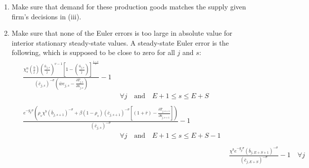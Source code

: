 \begin{enumerate}
    \item Make sure that demand for these production goods matches the supply given firm's decisions in (iii).
    \item Make sure that none of the Euler errors is too large in absolute value for interior stationary steady-state values. A steady-state Euler error is the following, which is supposed to be close to zero for all $j$ and $s$:
      \begin{align}
        \begin{split}
          &\frac{\chi^n_{s}\left(\frac{b}{\tilde{l}}\right)\left(\frac{\bar{n}_{j,s}}{\tilde{l}}\right)^{v-1}\left[1 - \left(\frac{\bar{n}_{j,s}}{\tilde{l}}\right)\right]^{\frac{1-v}{v}}}{(\bar{c}_{j,s})^{-\sigma}\left(\bar{w} e_{j,s} - \frac{\partial\bar{T}_{j,s}}{\partial \bar{n}_{j,s}}\right)} - 1 \\
          &\qquad\qquad\qquad\qquad\qquad\qquad\qquad\forall j\quad\text{and}\quad E+1\leq s\leq E+S
        \end{split} \label{EqSSeulerrLab} \\
        \begin{split}
          &\frac{e^{-g_y\sigma}\left(\rho_s\chi^b \left(\bar{b}_{j,s+1}\right)^{-\sigma} + \beta(1-\rho_s)(\bar{c}_{j,s+1})^{-\sigma}\left[(1 + \bar{r}) - \frac{\partial \bar{T}_{j,s+1}}{\partial \bar{b}_{j,s+1}}\right]\right)}{(\bar{c}_{j,s})^{-\sigma}} - 1 \\
          &\qquad\qquad\qquad\qquad\qquad\qquad\qquad\forall j \quad\text{and}\quad E+1\leq s\leq E+S-1 \\
        \end{split} \label{EqSSeulerrSav} \\
        &\frac{\chi^b e^{-g_y\sigma}(\bar{b}_{j,E+S+1})^{-\sigma}}{\left(\bar{c}_{j,E+S}\right)^{-\sigma}} - 1 \quad\forall j \label{EqSSeulerrBeq}
      \end{align}
  \end{enumerate}
  
   

